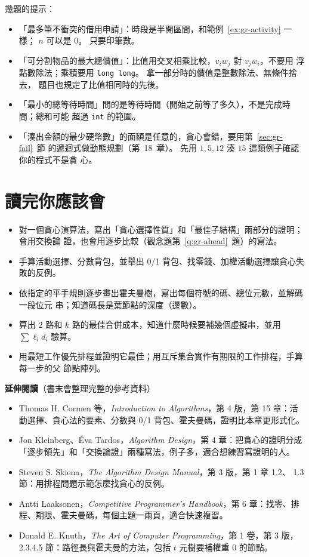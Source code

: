 幾題的提示：

\begin{itemize}
\item 「最多筆不衝突的借用申請」：時段是半開區間，和範例~\ref{ex:gr-activity} 一樣；
$n$ 可以是 $0$。 只要印筆數。
\item 「可分割物品的最大總價值」：比值用交叉相乘比較，$v_i w_j$ 對 $v_j w_i$，不要用
浮點數除法；乘積要用 \texttt{long long}。 拿一部分時的價值是整數除法、無條件捨去，
題目也規定了比值相同時的先後。
\item 「最小的總等待時間」問的是等待時間（開始之前等了多久），不是完成時間；總和可能
超過 \texttt{int} 的範圍。
\item 「湊出金額的最少硬幣數」的面額是任意的，貪心會錯，要用第~\ref{sec:gr-fail}~節
的遞迴式做動態規劃（第~18~章）。 先用 $1, 5, 12$ 湊 $15$ 這類例子確認你的程式不是貪
心。
\end{itemize}

\section{讀完你應該會}
\label{sec:gr-checklist}

\begin{itemize}
\item 對一個貪心演算法，寫出「貪心選擇性質」和「最佳子結構」兩部分的證明；會用交換論
證，也會用逐步比較（觀念題第~\ref{q:gr-ahead}~題）的寫法。
\item 手算活動選擇、分數背包，並舉出 0/1 背包、找零錢、加權活動選擇讓貪心失敗的反例。
\item 依指定的平手規則逐步畫出霍夫曼樹，寫出每個符號的碼、總位元數，並解碼一段位元
串；知道碼長是葉節點的深度（邊數）。
\item 算出 $2$ 路和 $k$ 路的最佳合併成本，知道什麼時候要補幾個虛擬串，並用
$\sum \ell_i d_i$ 驗算。
\item 用最短工作優先排程並證明它最佳；用互斥集合實作有期限的工作排程，手算每一步的父
節點陣列。
\end{itemize}

\textbf{延伸閱讀}（書末會整理完整的參考資料）

\begin{itemize}
\item Thomas H. Cormen 等，\textit{Introduction to Algorithms}，第 4 版，第 15 章：活
動選擇、貪心法的要素、分數與 0/1 背包、霍夫曼碼，證明比本章更形式化。
\item Jon Kleinberg、Éva Tardos，\textit{Algorithm Design}，第 4 章：把貪心的證明分成
「逐步領先」和「交換論證」兩種寫法，例子多，適合想練習寫證明的人。
\item Steven S. Skiena，\textit{The Algorithm Design Manual}，第 3 版，第 1 章 1.2、
1.3 節：用排程問題示範怎麼找貪心的反例。
\item Antti Laaksonen，\textit{Competitive Programmer's Handbook}，第 6 章：找零、排
程、期限、霍夫曼碼，每個主題一兩頁，適合快速複習。
\item Donald E. Knuth，\textit{The Art of Computer Programming}，第 1 卷，第 3 版，
2.3.4.5 節：路徑長與霍夫曼的方法，包括 $t$ 元樹要補權重 $0$ 的節點。
\end{itemize}

